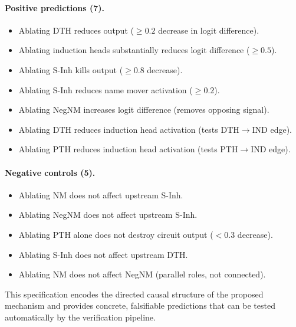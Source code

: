 \documentclass[10pt]{article}
\begin{document}
\paragraph{Positive predictions (7).}
\begin{itemize}[nosep]
    \item Ablating DTH reduces output ($\geq 0.2$ decrease in logit difference).
    \item Ablating induction heads substantially reduces logit difference ($\geq 0.5$).
    \item Ablating S-Inh kills output ($\geq 0.8$ decrease).
    \item Ablating S-Inh reduces name mover activation ($\geq 0.2$).
    \item Ablating NegNM increases logit difference (removes opposing signal).
    \item Ablating DTH reduces induction head activation (tests DTH$\rightarrow$IND edge).
    \item Ablating PTH reduces induction head activation (tests PTH$\rightarrow$IND edge).
\end{itemize}

\paragraph{Negative controls (5).}
\begin{itemize}[nosep]
    \item Ablating NM does not affect upstream S-Inh.
    \item Ablating NegNM does not affect upstream S-Inh.
    \item Ablating PTH alone does not destroy circuit output ($< 0.3$ decrease).
    \item Ablating S-Inh does not affect upstream DTH.
    \item Ablating NM does not affect NegNM (parallel roles, not connected).
\end{itemize}

This specification encodes the directed causal structure of the proposed mechanism and provides concrete, falsifiable predictions that can be tested automatically by the verification pipeline.
\end{document}

